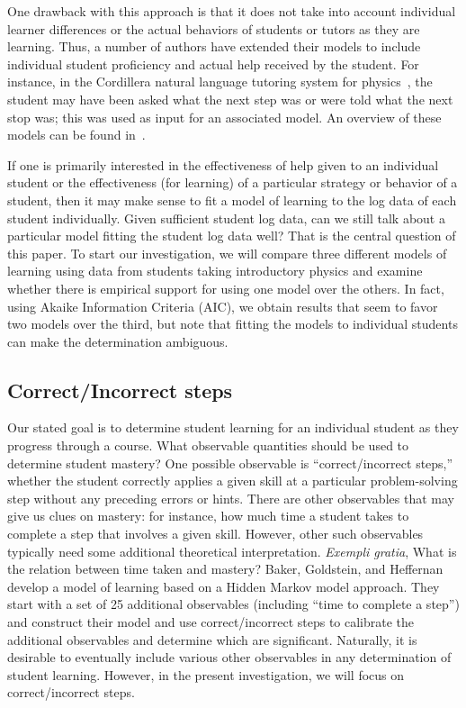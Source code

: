 \documentclass{edm_template}
\begin{document}
One drawback with this approach is that it does not take into account
individual learner differences or the actual behaviors of students or
tutors as they are learning.  Thus, a number of authors have extended
their models to include individual student proficiency and actual help
received by the student.  For instance, in the Cordillera natural
language tutoring system for physics~\cite{vanlehn_developing_2007},
the student may have been asked what the next step was or were told
what the next stop was; this was used as input for an associated
model.  An overview of these models can be found 
in~\cite{chi_instructional_2011}.

If one is primarily interested in the effectiveness of help given to
an individual student or the effectiveness (for learning) of a particular
strategy or behavior of a student, then it may make sense
to fit a model of learning to the log data of each student individually.
Given sufficient student log data, can we still talk about a particular
model fitting the student log data well?  That is the central question
of this paper.
To start our investigation, we will compare three different models of
learning using data from students taking introductory physics and examine
whether there is empirical support for using one model over the
others.  In fact, using Akaike Information Criteria (AIC), we obtain
results that seem to favor two models over the third, but note
that fitting the models to individual students can make the determination ambiguous.


\subsection{Correct/Incorrect steps}

Our stated goal is to determine student learning for an individual
student as they progress through a course.  What observable quantities
should be used to determine student mastery?  One possible observable
is ``correct/incorrect steps,'' whether the student correctly applies
a given skill at a particular problem-solving step without any
preceding errors or hints.  There are other observables that may give
us clues on mastery: for instance, how much time a student takes to
complete a step that involves a given skill.  However, other such
observables typically need some additional theoretical
interpretation. {\em Exempli gratia}, What is the relation between
time taken and mastery?  Baker, Goldstein, and
Heffernan~\citeyear{baker_detecting_2011} develop a model of learning
based on a Hidden Markov model approach.  They start with a set of
25 additional observables (including ``time to complete a step'') and
construct their model and use correct/incorrect steps
to calibrate the additional observables and determine which are
significant.  Naturally, it is
desirable to eventually include various other observables in any
determination of student learning.  However, in the present investigation,
we will focus on correct/incorrect steps.
\end{document}
